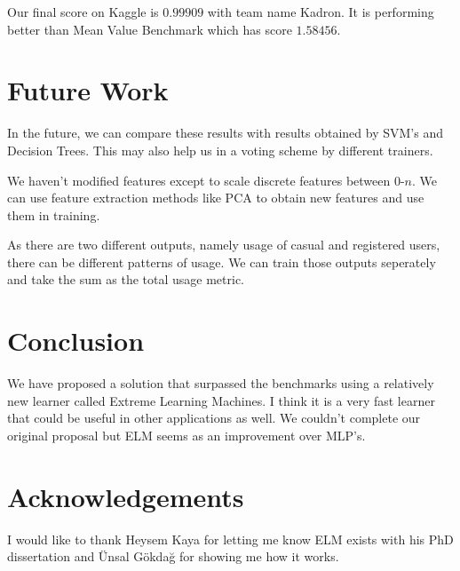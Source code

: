 \documentclass[11pt]{article} %
\begin{document}
Our final score on Kaggle is $0.99909$ with team name Kadron. It is performing better than Mean Value Benchmark which has score $1.58456$.

\section{Future Work}
In the future, we can compare these results with results obtained by SVM's and Decision Trees. This may also help us in a voting scheme by different trainers.

We haven't modified features except to scale discrete features between 0-$n$. We can use feature extraction methods like PCA to obtain new features and use them in training.

As there are two different outputs, namely usage of casual and registered users, there can be different patterns of usage. We can train those outputs seperately and take the sum as the total usage metric.

\section{Conclusion}
We have proposed a solution that surpassed the benchmarks using a relatively new learner called Extreme Learning Machines. I think it is a very fast learner that could be useful in other applications as well. We couldn't complete our original proposal but ELM seems as an improvement over MLP's.

\section{Acknowledgements}
I would like to thank Heysem Kaya for letting me know ELM exists with his PhD dissertation and Ünsal Gökdağ for showing me how it works.



\end{document}
